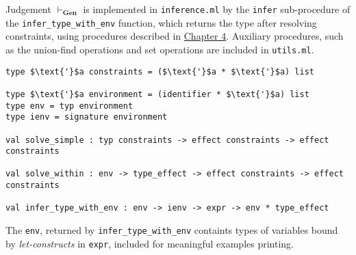 \documentclass[declaration,shortabstract]{iithesis}
\theoremstyle{definition} \newtheorem{definition}{Definition}[section]
\begin{document}
Judgement $\vdash_\textbf{Gen}$ is implemented in \texttt{inference.ml} 
by the \texttt{infer} sub-procedure of the \texttt{infer\_type\_with\_env}  function,
which returns the type after resolving constraints, using procedures described in \hyperlink{section.4.2}{Chapter 4}.
Auxiliary procedures, such as the union-find operations and set operations are included in 
\texttt{utils.ml}.

\begin{lstlisting}
type $\text{'}$a constraints = ($\text{'}$a * $\text{'}$a) list

type $\text{'}$a environment = (identifier * $\text{'}$a) list
type env = typ environment
type ienv = signature environment

val solve_simple : typ constraints -> effect constraints -> effect constraints

val solve_within : env -> type_effect -> effect constraints -> effect constraints

val infer_type_with_env : env -> ienv -> expr -> env * type_effect
\end{lstlisting}
The \texttt{env}, returned by \texttt{infer\_type\_with\_env} containts
types of variables bound by \textit{let-constructs} in \texttt{expr}, included for meaningful examples printing.

\end{document}

